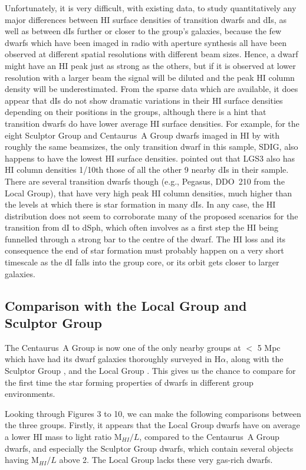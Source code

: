 \documentclass[preprint]{aastex}
\begin{document}
Unfortunately, it is very difficult, with existing data, to study 
quantitatively any major
differences between HI surface densities of transition dwarfs and dIs,
as well as between dIs further or closer to the group's galaxies, because the
few dwarfs which have been imaged in radio with aperture synthesis all have
been observed at different spatial resolutions with different beam sizes.
Hence, a dwarf might have an HI peak just as strong as the others, but if 
it is observed at lower resolution with a larger beam the signal will 
be diluted and the peak HI column density will be underestimated. From the 
sparse data which are available, it does appear that dIs do not show 
dramatic variations in their HI surface densities depending on their 
positions in the groups, although there is a hint that transition dwarfs
do have lower average HI surface densities. For example, for the eight Sculptor 
Group and Centaurus~A Group dwarfs
imaged in HI by \citet{ccf00} with roughly the same beamsizes, the only
transition dwarf in this sample, SDIG, also happens to have the lowest HI surface 
densities. \citet{lsy93} pointed out that LGS3 also has HI column densities 1/10th
those of all the other 9 nearby dIs in their sample. 
There are several transition dwarfs though (e.g., Pegasus, DDO~210 from the 
Local Group), that have very high peak HI column densities, much higher than 
the levels at which there
is star formation in many dIs. In any case, the HI distribution does not seem
to corroborate many of the proposed scenarios for the transition from dI to dSph,
which often involves as a first step the HI being funnelled through a strong bar 
to the centre of the dwarf. 
The HI loss and its consequence the end of star formation must probably happen 
on a very short timescale as the dI falls into the group core, or its orbit 
gets closer to larger galaxies.

\subsection{Comparison with the Local Group and Sculptor Group}

The Centaurus~A Group is now one of the only nearby groups at $<$ 5 Mpc which have
had its dwarf galaxies thoroughly surveyed in H$\alpha$, along with the Sculptor
Group \citep{scm03a}, and the Local Group \citep[see][review]{m98}.
This gives us the chance to compare for the first time the star forming properties
of dwarfs in different group environments. 

Looking through Figures 3 to 10, we can make the following comparisons between
the three groups. Firstly, it appears that the Local Group dwarfs have on average
a lower HI mass to light ratio M$_{HI}/L$, compared to the Centaurus~A Group dwarfs, 
and especially the Sculptor Group dwarfs, which contain several objects 
having M$_{HI}/L$ above 2.  The Local Group lacks these very gas-rich dwarfs. 
\end{document}

